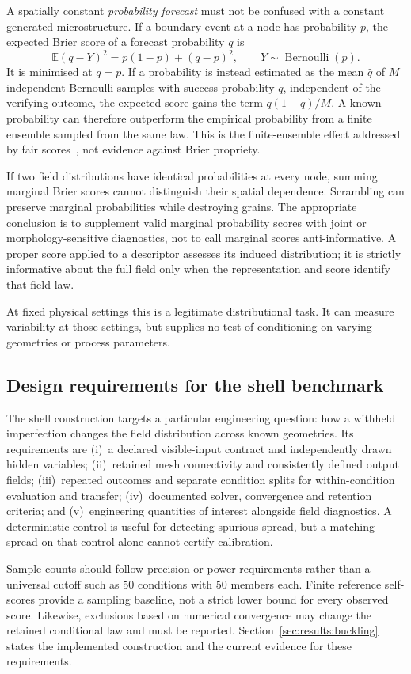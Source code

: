 A spatially constant \emph{probability forecast} must not be confused with a
constant generated microstructure. If a boundary event at a node has
probability $p$, the expected Brier score of a forecast probability $q$ is
\begin{equation}
  \mathbb{E}(q-Y)^2 = p(1-p)+(q-p)^2,\qquad Y\sim\operatorname{Bernoulli}(p).
  \label{eq:brier-marginal}
\end{equation}
It is minimised at $q=p$. If a probability is instead estimated as the mean
$\hat q$ of $M$ independent Bernoulli samples with success probability $q$,
independent of the verifying outcome, the expected score gains the term
$q(1-q)/M$. A known probability can therefore outperform the empirical
probability from a finite ensemble sampled from the same law. This is the
finite-ensemble effect addressed by fair scores~\cite{ferro2014fair}, not
evidence against Brier propriety.

If two field distributions have identical probabilities at every node,
summing marginal Brier scores cannot distinguish their spatial dependence.
Scrambling can preserve marginal probabilities while destroying grains.
The appropriate conclusion is to supplement valid marginal probability
scores with joint or morphology-sensitive diagnostics, not to call marginal
scores anti-informative. A proper score applied to a descriptor assesses its
induced distribution; it is strictly informative about the full field only
when the representation and score identify that field law.

At fixed physical settings this is a legitimate distributional task. It can
measure variability at those settings, but supplies no test of conditioning
on varying geometries or process parameters.

\subsection{Design requirements for the shell benchmark}
\label{sec:bench:missing}

The shell construction targets a particular engineering question: how a
withheld imperfection changes the field distribution across known geometries.
Its requirements are (i)~a declared visible-input contract and independently
drawn hidden variables; (ii)~retained mesh connectivity and consistently
defined output fields; (iii)~repeated outcomes and separate condition splits
for within-condition evaluation and transfer; (iv)~documented solver,
convergence and retention criteria; and (v)~engineering quantities of interest
alongside field diagnostics. A deterministic control is useful for detecting
spurious spread, but a matching spread on that control alone cannot certify
calibration.

Sample counts should follow precision or power requirements rather than a
universal cutoff such as $50$ conditions with $50$ members each. Finite
reference self-scores provide a sampling baseline, not a strict lower bound
for every observed score. Likewise, exclusions based on numerical convergence
may change the retained conditional law and must be reported.
Section~\ref{sec:results:buckling} states the implemented construction and
the current evidence for these requirements.

